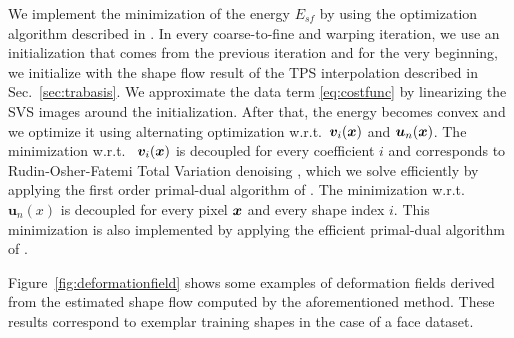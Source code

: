 We implement the minimization of the energy $E_{sf}$ by using the optimization algorithm described in \cite{Garg:2013hu}. In every coarse-to-fine and warping iteration, we use an initialization that comes from the previous iteration and for the very beginning, we initialize with the shape flow result of the TPS interpolation described in Sec.~\ref{sec:trabasis}. We approximate the data term \eqref{eq:costfunc} by linearizing the SVS images around the initialization. After that, the energy becomes convex and we optimize it using alternating optimization w.r.t.~$\bm{v}_i(\boldsymbol{x})$ and $\bm{u}_n(\boldsymbol{x})$. The minimization w.r.t.~
$\bm{v}_i(\boldsymbol{x})$ is decoupled for every coefficient $i$ and corresponds to Rudin-Osher-Fatemi Total Variation denoising \cite{rudin92}, which we solve efficiently by applying the first order primal-dual algorithm of \cite{Chambolle:Pock:JMIV2011}. The minimization w.r.t.~
$\bm{u}_n(x)$ is decoupled for every pixel $\boldsymbol{x}$ and every shape index $i$. This minimization is also implemented by applying the efficient primal-dual algorithm of \cite{Chambolle:Pock:JMIV2011}.



Figure~\ref{fig:deformationfield} shows some examples of deformation fields derived from the estimated shape flow computed by the aforementioned method. These results correspond to exemplar training shapes in the case of a face dataset.






